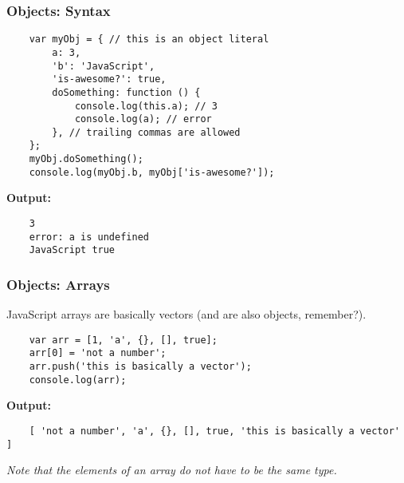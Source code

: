 \documentclass{lug}
\begin{document}
\begin{frame}[fragile]
    \frametitle{Objects: Syntax}

    \begin{verbatim}
    var myObj = { // this is an object literal
        a: 3,
        'b': 'JavaScript',
        'is-awesome?': true,
        doSomething: function () {
            console.log(this.a); // 3
            console.log(a); // error
        }, // trailing commas are allowed
    };
    myObj.doSomething();
    console.log(myObj.b, myObj['is-awesome?']);
    \end{verbatim}

    \textbf{Output:}
    \begin{verbatim}
    3
    error: a is undefined
    JavaScript true
    \end{verbatim}

\end{frame}

\begin{frame}[fragile]
    \frametitle{Objects: Arrays}

    JavaScript arrays are basically vectors (and are also objects, remember?).

    \begin{verbatim}
    var arr = [1, 'a', {}, [], true];
    arr[0] = 'not a number';
    arr.push('this is basically a vector');
    console.log(arr);
    \end{verbatim}

    \textbf{Output:}
    \begin{verbatim}
    [ 'not a number', 'a', {}, [], true, 'this is basically a vector' ]
    \end{verbatim}

    \textit{Note that the elements of an array do not have to be the same type.}

\end{frame}
\end{document}
